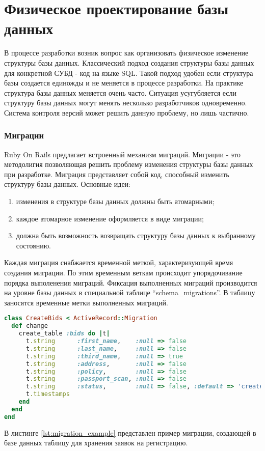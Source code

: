 \section{Физическое проектирование базы данных}
В процессе разработки возник вопрос как организовать физическое изменение
структуры базы данных. Классический подход создания структуры базы данных для
конкретной СУБД - код на языке SQL. Такой подход удобен если структура базы
создается единожды и не меняется в процессе разработки. На практике структура
базы данных меняется очень часто. Ситуация усугубляется если структуру базы
данных могут менять несколько разработчиков одновременно. Система контроля
версий может решить данную проблему, но лишь частично.

\subsubsection{Миграции}
Ruby On Rails предлагает встроенный механизм миграций. Миграции - это
методолигия позволяющая решить проблему изменения структуры базы данных при
разработке. Миграция представляет собой код, способный изменить структуру базы
данных.
Основные идеи:
\begin{enumerate}
  \item изменения в структуре базы данных должны быть атомарными;
  \item каждое атомарное изменение оформляется в виде миграции;
  \item должна быть возможность возвращать структуру базы данных к выбранному
состоянию.
\end{enumerate}

Каждая миграция снабжается временной меткой, характеризующей время создания
миграции. По этим временным веткам происходит упорядочивание порядка выполенения
миграций. Фиксация выполненных миграций производится на уровне базы данных в
специальной таблице “schema\_migrations”. В таблицу заносятся временные метки
выполненных миграций.

\begin{lstlisting}[language=Ruby,caption=Пример миграций
,label={lst:migration_example}] 
class CreateBids < ActiveRecord::Migration
  def change
    create_table :bids do |t|
      t.string      :first_name,    :null => false
      t.string      :last_name,     :null => false
      t.string      :third_name,    :null => true
      t.string      :address,       :null => false
      t.string      :policy,        :null => false
      t.string      :passport_scan, :null => false
      t.string      :status,        :null => false, :default => 'created'
      t.timestamps
    end
  end
end
\end{lstlisting}

В листинге \ref{lst:migration_example} представлен пример миграции, создающей в
базе данных таблицу для хранения заявок на регистрацию.
